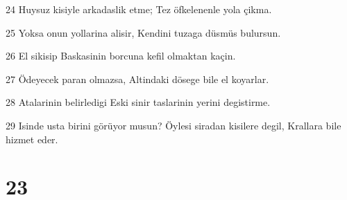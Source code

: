 \par 24 Huysuz kisiyle arkadaslik etme; Tez öfkelenenle yola çikma.
\par 25 Yoksa onun yollarina alisir, Kendini tuzaga düsmüs bulursun.
\par 26 El sikisip Baskasinin borcuna kefil olmaktan kaçin.
\par 27 Ödeyecek paran olmazsa, Altindaki dösege bile el koyarlar.
\par 28 Atalarinin belirledigi Eski sinir taslarinin yerini degistirme.
\par 29 Isinde usta birini görüyor musun? Öylesi siradan kisilere degil, Krallara bile hizmet eder.

\chapter{23}

